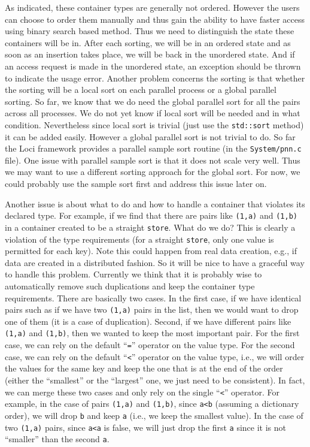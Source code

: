 \documentclass{article}
\begin{document}
As indicated, these container types are generally not ordered.  However
the users can choose to order them manually and thus gain the ability to
have faster access using binary search based method.  Thus we need to
distinguish the state these containers will be in.  After each sorting,
we will be in an ordered state and as soon as an insertion takes place,
we will be back in the unordered state.  And if an access request is
made in the unordered state, an exception should be thrown to indicate
the usage error.  Another problem concerns the sorting is that whether
the sorting will be a local sort on each parallel process or a global
parallel sorting.  So far, we know that we do need the global parallel
sort for all the pairs across all processes.  We do not yet know if
local sort will be needed and in what condition.  Nevertheless since
local sort is trivial (just use the \texttt{std::sort} method) it can be
added easily.  However a global parallel sort is not trivial to do.  So
far the Loci framework provides a parallel sample sort routine (in the
\texttt{System/pnn.c} file).  One issue with parallel sample sort is
that it does not scale very well.  Thus we may want to use a different
sorting approach for the global sort.  For now, we could probably use
the sample sort first and address this issue later on. 

Another issue is about what to do and how to handle a container that
violates its declared type.  For example, if we find that there are
pairs like \texttt{(1,a)} and \texttt{(1,b)} in a container created to
be a straight \texttt{store}.  What do we do?  This is clearly a
violation of the type requirements (for a straight \texttt{store}, only
one value is permitted for each key).  Note this could happen from real
data creation, e.g., if data are created in a distributed fashion.  So
it will be nice to have a graceful way to handle this problem.
Currently we think that it is probably wise to automatically remove such
duplications and keep the container type requirements.  There are
basically two cases.  In the first case, if we have identical pairs such
as if we have two \texttt{(1,a)} pairs in the list, then we would want
to drop one of them (it is a case of duplication).  Second, if we have
different pairs like \texttt{(1,a)} and \texttt{(1,b)}, then we wanted
to keep the most important pair.  For the first case, we can rely on the
default ``\texttt{=}'' operator on the value type.  For the second case,
we can rely on the default ``\texttt{<}'' operator on the value type,
i.e., we will order the values for the same key and keep the one that is
at the end of the order (either the ``smallest'' or the ``largest''
one, we just need to be consistent).  In fact, we can merge these two
cases and only rely on the single ``\texttt{<}'' operator.  For example,
in the case of pairs \texttt{(1,a)} and \texttt{(1,b)}, since
\texttt{a<b} (assuming a dictionary order), we will drop \texttt{b} and
keep \texttt{a} (i.e., we keep the smallest value).  In the case of two
\texttt{(1,a)} pairs, since \texttt{a<a} is false, we will just drop the
first \texttt{a} since it is not ``smaller'' than the second \texttt{a}.
\end{document}
